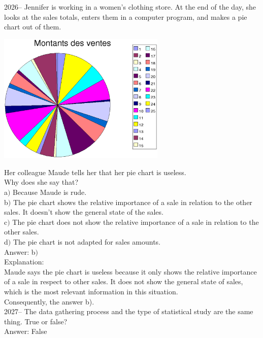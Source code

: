 \documentclass[letterpaper, 12pt]{article}
\begin{document}

2026-- Jennifer is working in a women's clothing store. At the end
of the day, she looks at the sales totals, enters them in a computer
program, and makes a pie chart out of them.
\begin{center}
 \includegraphics[width=8cm]{Q2058b.eps}
\end{center}
Her colleague Maude tells her that her pie chart is useless.\\
Why does she say that?\\

a$)$ Because Maude is rude.\\
b$)$ The pie chart shows the relative importance of a sale in relation to the other sales. It doesn't show the general state of the sales.\\
c$)$ The pie chart does not show the relative importance of a sale in relation to the other sales.\\
d$)$ The pie chart is not adapted for sales amounts.\\

Answer: b$)$\\

Explanation:\\
Maude says the pie chart is useless because it only shows the relative importance of a sale in respect to other sales. It does not show the general state of sales, which is the most relevant information in this situation.\\
Consequently, the answer b).\\

2027-- The data gathering process and the type of statistical study are the same thing. True or false?\\

Answer: False\\
\end{document}
